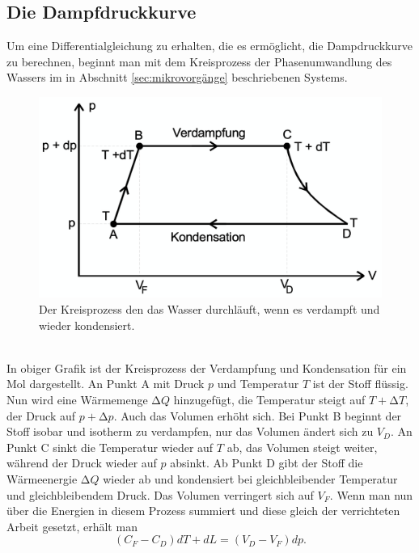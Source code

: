   \subsection{Die Dampfdruckkurve}
  \label{sec:dampfdruckkurve}
    Um eine Differentialgleichung zu erhalten, die es ermöglicht, die Dampdruckkurve zu berechnen, beginnt man mit dem
    Kreisprozess der Phasenumwandlung des Wassers im in Abschnitt \ref{sec:mikrovorgänge} beschriebenen Systems.
    \\
    \begin{figure}
      \centering
        \label{fig:kreisprozess}
          \includegraphics[scale=0.2]{Content/kreisprozess.png}
          \caption{Der Kreisprozess den das Wasser durchläuft, wenn es verdampft und wieder kondensiert.}
    \end{figure}
    \\
    \noindent
    In obiger Grafik ist der Kreisprozess der Verdampfung und Kondensation für ein Mol dargestellt. An Punkt A mit Druck $p$ und
    Temperatur $T$ ist der Stoff flüssig. Nun wird eine Wärmemenge $\increment Q$ hinzugefügt, die Temperatur steigt auf
    $T + \increment T$, der Druck auf $p + \increment p$. Auch das Volumen erhöht sich. Bei Punkt B beginnt der Stoff isobar
    und isotherm zu verdampfen, nur das Volumen ändert sich zu $V_{D}$. An Punkt C sinkt die Temperatur wieder auf $T$ ab, das
    Volumen steigt weiter, während der Druck wieder auf $p$ absinkt. Ab Punkt D gibt der Stoff die Wärmeenergie $\increment Q$
    wieder ab und kondensiert bei gleichbleibender Temperatur und gleichbleibendem Druck. Das Volumen verringert sich auf
    $V_{F}$.
    Wenn man nun über die Energien in diesem Prozess summiert und diese gleich der verrichteten Arbeit gesetzt, erhält man
    \begin{equation*}
      \label{eqn:wärmeenergiearbeit}
      (C_{F} - C_{D})dT + dL = (V_{D} - V_{F})dp.
    \end{equation*}

